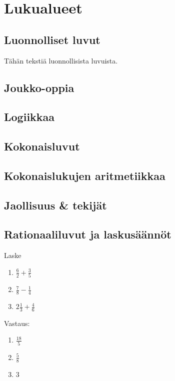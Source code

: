 


\part{Lukualueet}
\chapter{Luonnolliset luvut}

Tähän tekstiä luonnollisista luvuista.

\chapter{Joukko-oppia}
\chapter{Logiikkaa}
\chapter{Kokonaisluvut}
\chapter{Kokonaislukujen aritmetiikkaa}
\chapter{Jaollisuus \& tekijät}
\chapter{Rationaaliluvut ja laskusäännöt}

\begin{tehtava}
	Laske %
	\begin{enumerate}
	\item $\frac{6}{2} + \frac{3}{5}$
	\item $\frac{7}{8} - \frac{1}{4}$
	\item $2 \frac{1}{3} + \frac{4}{6}$	
	\end{enumerate}
	
	\begin{vastaus}
	Vastaus:
	\begin{enumerate}
		\item $\frac{18}{5}$
		\item $\frac{5}{8}$
		\item $3$
	\end{enumerate}			
	\end{vastaus}
\end{tehtava}

